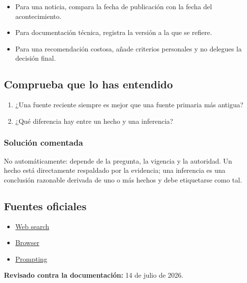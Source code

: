 \documentclass[10pt,a4paper,openany]{book}
\providecommand{\tightlist}{\setlength{\itemsep}{0.18em}\setlength{\parskip}{0pt}}
\begin{document}
\begin{itemize}
\tightlist
\item
  Para una noticia, compara la fecha de publicación con la fecha del
  acontecimiento.
\item
  Para documentación técnica, registra la versión a la que se refiere.
\item
  Para una recomendación costosa, añade criterios personales y no
  delegues la decisión final.
\end{itemize}

\subsection{Comprueba que lo has
entendido}\label{comprueba-que-lo-has-entendido-8}

\begin{enumerate}
\def\labelenumi{\arabic{enumi}.}
\tightlist
\item
  ¿Una fuente reciente siempre es mejor que una fuente primaria más
  antigua?
\item
  ¿Qué diferencia hay entre un hecho y una inferencia?
\end{enumerate}

\subsubsection{Solución comentada}\label{soluciuxf3n-comentada-9}

No automáticamente: depende de la pregunta, la vigencia y la autoridad.
Un hecho está directamente respaldado por la evidencia; una inferencia
es una conclusión razonable derivada de uno o más hechos y debe
etiquetarse como tal.

\subsection{Fuentes oficiales}\label{fuentes-oficiales-8}

\begin{itemize}
\tightlist
\item
  \href{https://learn.chatgpt.com/docs/web-search}{Web search}
\item
  \href{https://learn.chatgpt.com/docs/browser}{Browser}
\item
  \href{https://learn.chatgpt.com/docs/prompting}{Prompting}
\end{itemize}

\textbf{Revisado contra la documentación:} 14 de julio de 2026.
\end{document}
